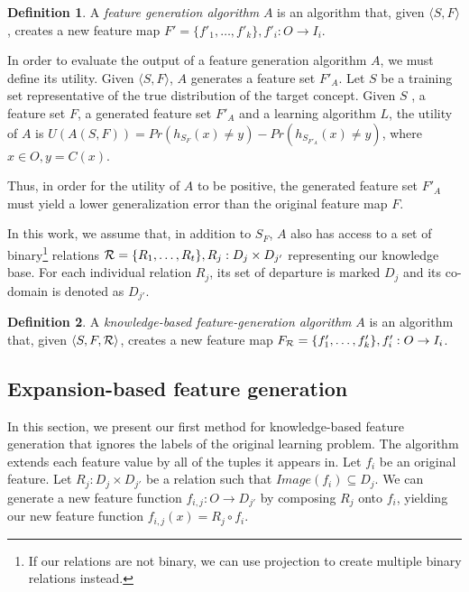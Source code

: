 \documentclass{article}
\theoremstyle{definition}
\newtheorem{defn}{Definition}[section]
\begin{document}
\begin{defn}
	A \emph{feature generation algorithm} $A$ is an algorithm that, given $\langle S,F\rangle$, creates a new feature map $F'=\{f'_{1},\ldots,f'_{k}\}, f'_{i}:O\rightarrow I_i$.
\end{defn}

In order to evaluate the output of a feature generation algorithm $A$, we must define its utility. Given $\langle S,F \rangle$, $A$ generates a feature set $F'_A$.
Let $S$ be a training set representative of the true distribution of the target concept.
Given $S$ , a feature set $F$, a generated feature set $F'_A$ and a learning algorithm $L$, the utility of $A$ is $U(A(S,F))=Pr(h_{S_F}(x)\neq y)-Pr(h_{S_{F'_A}}(x)\neq y)$, where $x\in O,y=C(x)$.

Thus, in order for the utility of $A$ to be positive, the generated feature set $F'_A$ must yield a lower generalization error than the original feature map $F$.

In this work, we assume that, in addition to $S_F$, $A$ also has access to a set of binary\footnote{If our relations are not binary, we can use projection to create multiple binary relations instead.} relations ${\cal R}=\{R_{1},\ldots,R_{t}\}, R_j:D_j\times D_{j'}$ representing our knowledge base. For each individual relation $R_j$, its set of departure is marked $D_j$ and its co-domain is denoted as $D_{j'}$. 
\begin{defn}
	A \emph{knowledge-based feature-generation algorithm} $A$ is an algorithm that, given $\langle S,F,{\cal R} \rangle$, creates a new feature map $F_{{\cal R}}=\{f'_{1},\ldots,f'_{k}\}, f'_{i}:O\rightarrow I_i$.
\end{defn}


\subsection{Expansion-based feature generation} \label{shallow_section}

In this section, we present our first method for knowledge-based feature generation that ignores the labels of the original learning problem.
The algorithm extends each feature value by all of the tuples it appears in.
Let $f_i$ be an original feature. Let $R_j:D_j\times D_{j'}$ be a relation such that  $Image(f_i) \subseteq D_j$. We can generate a new feature function $f_{i,j}:O\rightarrow D_{j'}$ by composing $R_j$ onto $f_i$, yielding our new feature function  $f_{i,j}(x)=R_j\circ f_i$.
\end{document}
